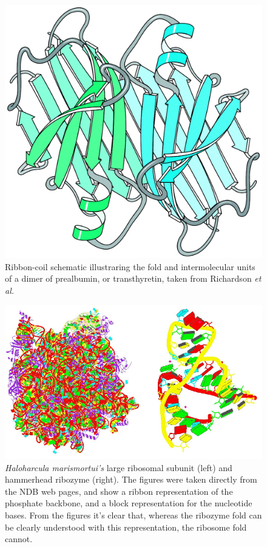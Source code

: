 \begin{figure}[ht]
\centering
\includegraphics[scale=0.4]{Chapter1/overallfold.png}
\caption{Ribbon-coil    schematic    illustraring    the   fold    and
  intermolecular  units of  a dimer  of prealbumin,  or transthyretin,
  taken from Richardson \textit{et al.} \cite{richardson2002}}
\end{figure}

\begin{figure}[t]
\centering
\includegraphics[scale=0.5]{Chapter1/ribosome_ribozyme.png}
\caption{\textit{Haloharcula marismortui's} large ribosomal subunit
(left) and hammerhead ribozyme (right).%
 The figures were taken
directly from the NDB web pages, and show a ribbon
representation of the phosphate backbone, and a block representation
for the nucleotide bases. From the figures it's clear that, whereas the
ribozyme fold can be clearly understood with this representation, the
ribosome fold cannot.}
\end{figure}


